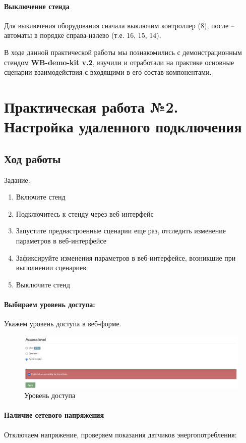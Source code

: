 \documentclass[a4paper,14pt]{extarticle}
\begin{document}
\paragraph*{Выключение стенда}
	Для выключения оборудования сначала выключим контроллер (8), после -- автоматы в
	порядке справа-налево (т.е. 16, 15, 14).
	
В ходе данной практической работы мы познакомились с демонстрационным стендом\textbf{ WB-demo-kit v.2}, изучили и отработали на практике основные сценарии взаимодействия с входящими в его состав компонентами.
\newpage
\section{Практическая работа №2.\\Настройка удаленного подключения}
\subsection{Ход работы}
Задание:
\begin{enumerate}
	\item Включите стенд 
    \item Подключитесь к стенду через веб интерфейс 
	\item Запустите преднастроенные сценарии еще раз, отследить изменение параметров в веб-интерфейсе 
	\item Зафиксируйте изменения параметров в веб-интерфейсе, возникшие при выполнении сценариев
	\item Выключите стенд
\end{enumerate}


\paragraph {Выбираем уровень доступа:}
Укажем уровень доступа в веб-форме.
\begin{figure}[hbpt]
	\centering
	\includegraphics[width=0.6\linewidth]{images/access}
	\caption{Уровень доступа}
	\label{fig:access}
\end{figure}

\paragraph {Наличие сетевого напряжения}
Отключаем напряжение, проверяем показания датчиков энергопотребления:
\end{document}
